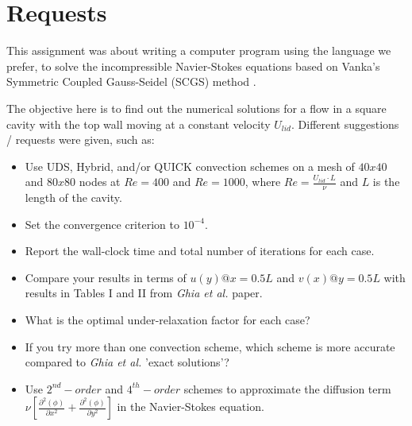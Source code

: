 \section{Requests}
\label{sec:requests}

This assignment was about writing a computer program using the language we prefer, to solve the incompressible Navier-Stokes equations based on Vanka's Symmetric Coupled Gauss-Seidel (SCGS) method \cite{VANKA1986138}.

The objective here is to find out the numerical solutions for a flow in a square cavity with the top wall moving at a constant velocity $U_{lid}$.
Different suggestions / requests were given, such as:

\begin{itemize}
    \item Use UDS, Hybrid, and/or QUICK convection schemes on a mesh of $40x40$ and $80x80$ nodes at $Re=400$ and $Re=1000$, where $Re = \frac{U_{lid} \cdot L}{\nu}$ and $L$ is the length of the cavity.
    \item Set the convergence criterion to $10^{-4}$.
    \item Report the wall-clock time and total number of iterations for each case.
    \item Compare your results in terms of $u(y)@x=0.5L$ and $v(x)@y=0.5L$ with results in Tables I and II from \textit{Ghia et al.} \cite{Ghia1982HighReSF} paper.
    \item What is the optimal under-relaxation factor for each case?
    \item If you try more than one convection scheme, which scheme is more accurate compared to \textit{Ghia et al.} \cite{Ghia1982HighReSF} 'exact solutions'?
    \item Use $2^{nd}-order$ and $4^{th}-order$ schemes to approximate the diffusion term $\nu \left[ \frac{\partial^2(\phi)}{\partial x^2} + \frac{\partial^2(\phi)}{\partial y^2} \right] $ in the Navier-Stokes equation.
\end{itemize}

